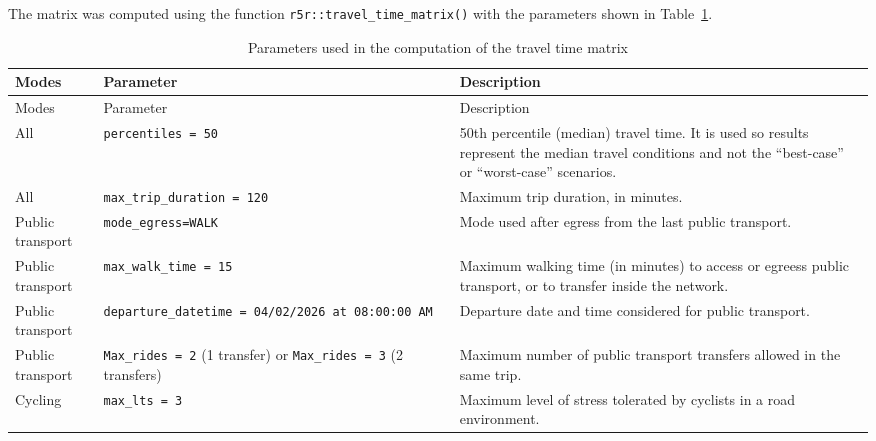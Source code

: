 \documentclass[
  authoryear,
  review,
  1p]{elsarticle}
\begin{document}
The matrix was computed using the function
\texttt{r5r::travel\_time\_matrix()} \citep{Pereira_Herszenhut_2023}
with the parameters shown in Table~\ref{tbl-ttm_parameters}.

\begin{longtable}[]{@{}
  >{\raggedright\arraybackslash}p{}
  >{\raggedright\arraybackslash}p{}
  >{\raggedright\arraybackslash}p{}@{}}
\caption{Parameters used in the computation of the travel time
matrix}\label{tbl-ttm_parameters}\tabularnewline
\toprule\noalign{}
\begin{minipage}[b]{\linewidth}\raggedright
Modes
\end{minipage} & \begin{minipage}[b]{\linewidth}\raggedright
Parameter
\end{minipage} & \begin{minipage}[b]{\linewidth}\raggedright
Description
\end{minipage} \\
\midrule\noalign{}
\endfirsthead
\toprule\noalign{}
\begin{minipage}[b]{\linewidth}\raggedright
Modes
\end{minipage} & \begin{minipage}[b]{\linewidth}\raggedright
Parameter
\end{minipage} & \begin{minipage}[b]{\linewidth}\raggedright
Description
\end{minipage} \\
\midrule\noalign{}
\endhead
\bottomrule\noalign{}
\endlastfoot
All & \texttt{percentiles\ =\ 50} & 50th percentile (median) travel
time. It is used so results represent the median travel conditions and
not the ``best-case'' or ``worst-case'' scenarios. \\
All & \texttt{max\_trip\_duration\ =\ 120} & Maximum trip duration, in
minutes. \\
Public transport & \texttt{mode\_egress=WALK} & Mode used after egress
from the last public transport. \\
Public transport & \texttt{max\_walk\_time\ =\ 15} & Maximum walking
time (in minutes) to access or egreess public transport, or to transfer
inside the network. \\
Public transport &
\texttt{departure\_datetime\ =\ 04/02/2026\ at\ 08:00:00\ AM} &
Departure date and time considered for public transport. \\
Public transport & \texttt{Max\_rides\ =\ 2} (1 transfer) or
\texttt{Max\_rides\ =\ 3} (2 transfers) & Maximum number of public
transport transfers allowed in the same trip. \\
Cycling & \texttt{max\_lts\ =\ 3} & Maximum level of stress tolerated by
cyclists in a road environment. \\
\end{longtable}
\end{document}
